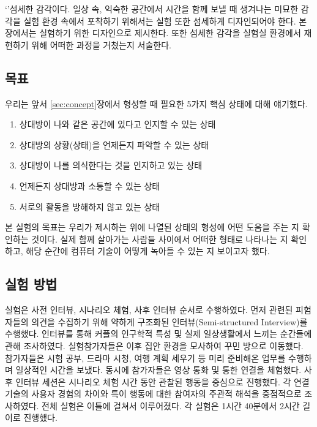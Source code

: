 `\concept'\는 섬세한 감각이다. 일상 속, 익숙한 공간에서 시간을 함께 보낼 때 생겨나는 미묘한 감각을 실험 환경 속에서 포착하기 위해서는 실험 또한 섬세하게 디자인되어야 한다. 본 장에서는 \concept\를 실험하기 위한 디자인으로 \expUser\를 제시한다. 또한 섬세한 감각을 실험실 환경에서 재현하기 위해 어떠한 과정을 거쳤는지 서술한다.

\subsection{목표}
\label{subsec:exp_goal}

우리는 앞서 \ref{sec:concept}장에서 \concept\를 형성할 때 필요한 5가지 핵심 상태에 대해 얘기했다.

\begin{center}
\begin{minipage}{.6\textwidth}
\begin{enumerate}[label=\Roman*., noitemsep]
	\item 상대방이 나와 같은 공간에 있다고 인지할 수 있는 상태
	\item 상대방의 상황(상태)을 언제든지 파악할 수 있는 상태
	\item 상대방이 나를 의식한다는 것을 인지하고 있는 상태
	\item 언제든지 상대방과 소통할 수 있는 상태
	\item 서로의 활동을 방해하지 않고 있는 상태
\end{enumerate}
\end{minipage}
\end{center}

\noindent 본 실험의 목표는 우리가 제시하는 \sysname\이 위에 나열된 상태의 형성에 어떤 도움을 주는 지 확인하는 것이다. 실제 함께 살아가는 사람들 사이에서 \concept\가 어떠한 형태로 나타나는 지 확인하고, 해당 순간에 컴퓨터 기술이 어떻게 녹아들 수 있는 지 보이고자 했다.


\subsection{실험 방법}

실험은 사전 인터뷰, 시나리오 체험, 사후 인터뷰 순서로 수행하였다.
먼저 \concept\와 관련된 피험자들의 의견을 수집하기 위해 약하게 구조화된 인터뷰(Semi-structured Interview)를 수행했다. 인터뷰를 통해 커플의 인구학적 특성 및 실제 일상생활에서 \concept\를 느끼는 순간들에 관해 조사하였다.
실험참가자들은 이후 집안 환경을 모사하여 꾸민 방으로 이동했다. 참가자들은 시험 공부, 드라마 시청, 여행 계획 세우기 등 미리 준비해온 업무를 수행하며 일상적인 시간을 보냈다. 동시에 참가자들은 영상 통화 및 \sysname\을 통한 연결을 체험했다.
사후 인터뷰 세션은 시나리오 체험 시간 동안 관찰된 행동을 중심으로 진행했다. 각 연결 기술의 사용자 경험의 차이와 특이 행동에 대한 참여자의 주관적 해석을 중점적으로 조사하였다.
전체 실험은 이틀에 걸쳐서 이루어졌다. 각 실험은 1시간 40분에서 2시간 길이로 진행했다.

